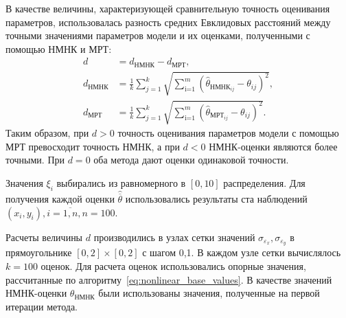В качестве величины, характеризующей сравнительную точность оценивания параметров,
использовалась разность средних Евклидовых расстояний
между точными значениями параметров модели и их оценками, полученными
с помощью НМНК и МРТ:
\begin{equation}
  \begin{aligned}
    d &= d_{\text{НМНК}} - d_{\text{МРТ}}, \\
    d_{\text{НМНК}} &=
    \frac{1}{k} \sum_{j=1}^k
    \sqrt{\sum_{\text{i=1}}^m (\hat{\theta}_{\text{НМНК}_{ij}} - \theta_{ij})^2}, \\
    d_{\text{МРТ}} &=
    \frac{1}{k} \sum_{j=1}^k
    \sqrt{\sum_{\text{i=1}}^m (\hat{\theta}_{\text{МРТ}_{ij}} - \theta_{ij})^2}.
  \end{aligned}
  \label{eq:dst_nonlinear_param}
\end{equation}
Таким образом, при \( d > 0 \) точность оценивания параметров модели с помощью МРТ
превосходит точность НМНК, а при \( d < 0 \) НМНК-оценки являются более точными.
При \( d = 0 \) оба метода дают оценки одинаковой точности.

Значения \( \xi_i \) выбирались из равномерного в \( [0, 10] \) распределения.
Для получения каждой оценки \( \hat{\overline{\theta}} \) использовались результаты
ста наблюдений \( ( x_i, y_i ), i = \overline{1, n}, n = 100 \).

Расчеты величины \( d \) производились в узлах сетки значений
\( \sigma_{\varepsilon_x}, \sigma_{\varepsilon_y} \) в прямоугольнике
\( [0, 2] \times [0, 2] \) с шагом 0{,}1.
В каждом узле сетки вычислялось \( k = 100 \) оценок.
Для расчета оценок использовались опорные значения,
рассчитанные по алгоритму~\eqref{eq:nonlinear_base_values}.
В качестве значений НМНК-оценки \( \theta_{\text{НМНК}} \)
были использованы значения, полученные на первой итерации метода.




